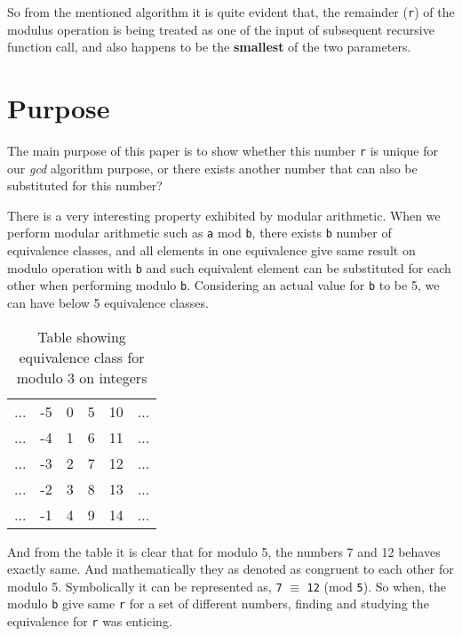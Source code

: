 \documentclass[12pt]{article}
\begin{document}
So from the mentioned algorithm it is quite evident that, the remainder (\texttt{r}) of the modulus operation is being treated as one of the input of subsequent recursive function call, and also happens to be the \textbf{smallest} of the two parameters.

\section{Purpose}
The main purpose of this paper is to show whether this number \texttt{r} is unique for our \textit{gcd} algorithm purpose, or there exists another number that can also be substituted for this number?

There is a very interesting property exhibited by modular arithmetic.
When we perform modular arithmetic such as \texttt{a} mod \texttt{b}, there exists
\texttt{b} number of equivalence classes, and all elements in one equivalence give same result on modulo operation with \texttt{b} and such equivalent element can be substituted for each other when performing modulo \texttt{b}.
\newline
Considering an actual value for \texttt{b} to be 5, we can have below 5 equivalence classes.

\begin{table}[h!]
\centering
	\begin{tabular}{c c c c c c}
		... & -5 & 0 & 5 & 10 & ... \\
		... & -4 & 1 & 6 & 11 & ... \\
		... & -3 & 2 & 7 & 12 & ... \\
		... & -2 & 3 & 8 & 13 & ... \\
		... & -1 & 4 & 9 & 14 & ...
	\end{tabular}
\caption{Table showing equivalence class for modulo 3 on integers}
\label{table:1}
\end{table}

And from the table it is clear that for modulo 5, the numbers 7 and 12 behaves exactly same. And mathematically they as denoted as congruent to each other for modulo 5.
Symbolically it can be represented as, \texttt{7} $\equiv$ \texttt{12} (mod \texttt{5}).
So when, the modulo \texttt{b} give same \texttt{r} for a set of different numbers, finding and studying the equivalence for \texttt{r} was enticing.
\end{document}
